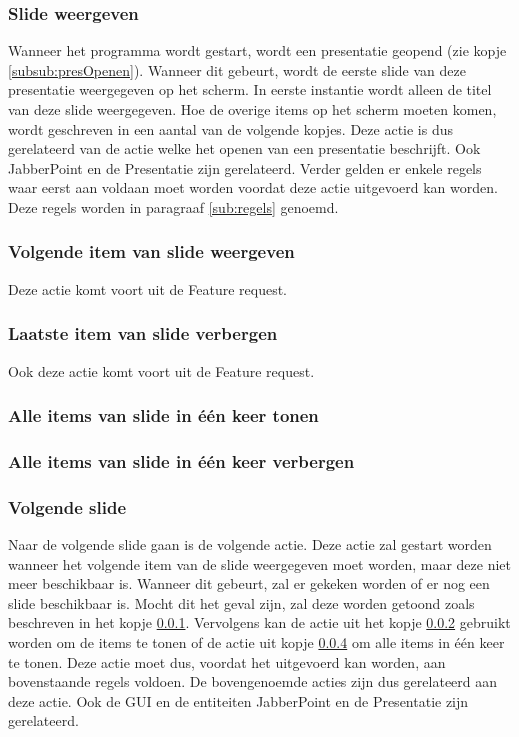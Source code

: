 \documentclass[a4paper]{article}
\begin{document}
\subsubsection{Slide weergeven}
\label{subsub:volgendeSlide}
Wanneer het programma wordt gestart, wordt een presentatie geopend (zie kopje \ref{subsub:presOpenen}). Wanneer dit gebeurt, wordt de eerste slide van deze presentatie weergegeven op het scherm. In eerste instantie wordt alleen de titel van deze slide weergegeven. Hoe de overige items op het scherm moeten komen, wordt geschreven in een aantal van de volgende kopjes. Deze actie is dus gerelateerd van de actie welke het openen van een presentatie beschrijft. Ook JabberPoint en de Presentatie zijn gerelateerd. Verder gelden er enkele regels waar eerst aan voldaan moet worden voordat deze actie uitgevoerd kan worden. Deze regels worden in paragraaf \ref{sub:regels} genoemd.

\subsubsection{Volgende item van slide weergeven}
\label{subsub:volgendeItem}
Deze actie komt voort uit de Feature request.

\subsubsection{Laatste item van slide verbergen}
Ook deze actie komt voort uit de Feature request.

\subsubsection{Alle items van slide in \'{e}\'{e}n keer tonen}
\label{subsub:alleItems}

\subsubsection{Alle items van slide in \'{e}\'{e}n keer verbergen}

\subsubsection{Volgende slide}
Naar de volgende slide gaan is de volgende actie. Deze actie zal gestart worden wanneer het volgende item van de slide weergegeven moet worden, maar deze niet meer beschikbaar is. Wanneer dit gebeurt, zal er gekeken worden of er nog een slide beschikbaar is. Mocht dit het geval zijn, zal deze worden getoond zoals beschreven in het kopje \ref{subsub:volgendeSlide}. Vervolgens kan de actie uit het kopje \ref{subsub:volgendeItem} gebruikt worden om de items te tonen of de actie uit kopje \ref{subsub:alleItems} om alle items in \'{e}\'{e}n keer te tonen. Deze actie moet dus, voordat het uitgevoerd kan worden, aan bovenstaande regels voldoen. De bovengenoemde acties zijn dus gerelateerd aan deze actie. Ook de GUI en de entiteiten JabberPoint en de Presentatie zijn gerelateerd.
\end{document}
